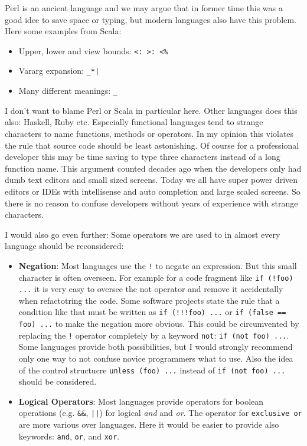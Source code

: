 \documentclass[11pt, a4paper]{report}
\begin{document}
Perl is an ancient language and we may argue that in former time this was a good idee to save space or typing, but modern languages also have this problem. Here some examples from Scala\cite{special-operators-scala}:

\begin{itemize}
    \item Upper, lower and view bounds: \texttt{<: >: <\%}
    \item Vararg expansion: \texttt{\_*|}
    \item Many different meanings: \texttt{\_}
\end{itemize}

I don't want to blame Perl or Scala in particular here. Other languages does this also: Haskell, Ruby etc. Especially functional languages tend to strange characters to name functions, methods or operators. In my opinion this violates the rule that source code should be least astonishing. Of course for a professional developer this may be time saving to type three characters instead of a long function name. This argument counted decades ago when the developers only had dumb text editors and small sized screens. Today we all have super power driven editors or IDEs with intellisense and auto completion and large scaled screens. So there is no reason to confuse developers without years of experience with strange characters.

I would also go even further: Some operators we are used to in almost every language should be reconsidered:

\begin{itemize}
    \item \textbf{Negation}: Most languages use the \texttt{!} to negate an expression. But this small character is often overseen. For example for a code fragment like \texttt{if (!foo) ...} it is very easy to oversee the not operator and remove it accidentally when refactotring the code. Some software projects state the rule that a condition like that must be written as \texttt{if (!!!foo) ...} or \texttt{if (false == foo) ...} to make the negation more obvious. This could be circumvented by replacing the \texttt{!} operator completely by a keyword \texttt{not}: \texttt{if (not foo) ...}. Some languages provide both possibilities, but I would strongly recommend only one way to not confuse novice programmers what to use. Also the idea of the control structucre \texttt{unless (foo) ...} instead of \texttt{if (not foo) ...} should be considered.
    \item \textbf{Logical Operators}: Most languages provide operators for boolean operations (e.g. \texttt{\&\&}, \texttt{||}) for logical \textit{and} and \textit{or}. The operator for \texttt{exclusive or} are more various over languages. Here it would be easier to provide also keywords: \texttt{and}, \texttt{or}, and \texttt{xor}.
\end{itemize}
\end{document}
